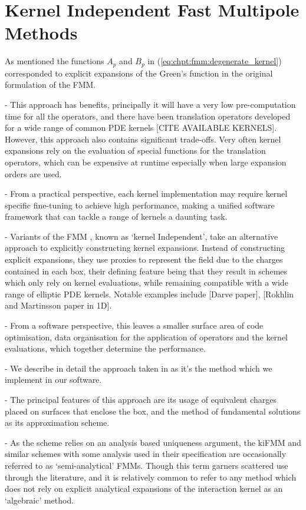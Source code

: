 \section{Kernel Independent Fast Multipole Methods}\label{chpt:fmm:sec:kifmm}

As mentioned the functions $A_p$ and $B_p$ in (\ref{eq:chpt:fmm:degenerate_kernel}) corresponded to explicit expansions of the Green's function in the original formulation of the FMM.

- This approach has benefits, principally it will have a very low pre-computation time for all the operators, and there have been translation operators developed for a wide range of common PDE kernels [CITE AVAILABLE KERNELS]. However, this approach also contains significant trade-offs. Very often kernel expansions rely on the evaluation of special functions for the translation operators, which can be expensive at runtime especially when large expansion orders are used.

- From a practical perspective, each kernel implementation may require kernel specific fine-tuning to achieve high performance, making a unified software framework that can tackle a range of kernels a daunting task.

- Variants of the FMM , known as `kernel Independent', take an alternative approach to explicitly constructing kernel expansions. Instead of constructing explicit expansions, they use proxies to represent the field due to the charges contained in each box, their defining feature being that they result in schemes which only rely on kernel evaluations, while remaining compatible with a wide range of elliptic PDE kernels. Notable examples include [Darve paper], [Rokhlin and Martinsson paper in 1D].

- From a software perspective, this leaves a smaller surface area of code optimisation, data organisation for the application of operators and the kernel evaluations, which together determine the performance.

- We describe in detail the approach taken in \cite{Ying:2004:JCP} as it's the method which we implement in our software.

- The principal features of this approach are its usage of equivalent charges placed on surfaces that enclose the box, and the method of fundamental solutions as its approximation scheme.

- As the scheme relies on an analysis based uniqueness argument, the kiFMM and similar schemes with some analysis used in their specification are occasionally referred to as `semi-analytical' FMMs. Though this term garners scattered use through the literature, and it is relatively common to refer to any method which does not rely on explicit analytical expansions of the interaction kernel as an `algebraic' method.

